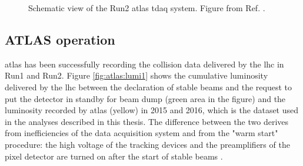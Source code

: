 \begin{figure}[ht]
\centering
{}
\caption{Schematic view of the Run2 \gls{atlas} \gls{tdaq} system. Figure from Ref. \cite{Aaboud:2016leb}.}
\label{fig:atlas:trig}
\end{figure}


\subsection{ATLAS operation}

\gls{atlas} has been successfully recording the collision data delivered by the \gls{lhc} in Run1 and Run2. Figure \ref{fig:atlas:lumi1} shows the cumulative luminosity delivered by the \gls{lhc} between the declaration of stable beams and the request to put the detector in standby for beam dump (green area in the figure) and the luminosity recorded by \gls{atlas} (yellow) in 2015 and 2016, which is the dataset used in the analyses described in this thesis. The difference between the two derives from inefficiencies of the data acquisition system and from the "warm start" procedure: the high voltage of the tracking devices and the preamplifiers of the pixel detector are turned on after the start of stable beams \cite{LumiTwiki}.


